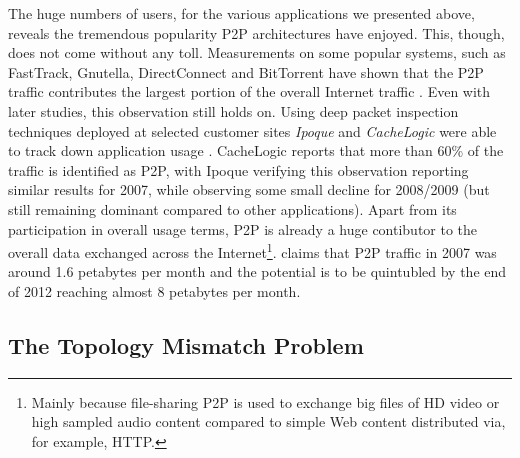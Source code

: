 

The huge numbers of users, for the various applications we presented above,
reveals the tremendous popularity P2P architectures have enjoyed. This, though,
does not come without any toll. Measurements on some popular systems, such as
FastTrack, Gnutella, DirectConnect and BitTorrent have shown that the P2P
traffic contributes the largest portion of the overall Internet traffic
\cite{seroiu_analysiscds_2002,sen_analyzep2ptraffic_2004,krp_ispfear_2005}.
Even with later studies, this observation still holds on. Using deep packet
inspection techniques deployed at selected customer sites \emph{Ipoque} and
\emph{CacheLogic} were able to track down application usage \cite{cachelogic,ipoque2007,ipoque2009}.
CacheLogic reports that more than 60\% of the traffic is identified as P2P, with
Ipoque verifying this observation reporting similar results for 2007, while
observing some small decline for 2008/2009 (but still remaining dominant
compared to other applications). Apart from its participation in overall usage
terms, P2P is already a huge contibutor to the overall data exchanged across the
Internet\footnote{
  Mainly because file-sharing P2P is used to exchange big files of HD video or
  high sampled audio content compared to simple Web content distributed via, for
  example, HTTP.
}.
\cite{multinteligence} claims that P2P traffic in 2007 was around 1.6 petabytes
per month and the potential is to be quintubled by the end of 2012 reaching
almost 8 petabytes per month.

\subsection{The Topology Mismatch Problem}


